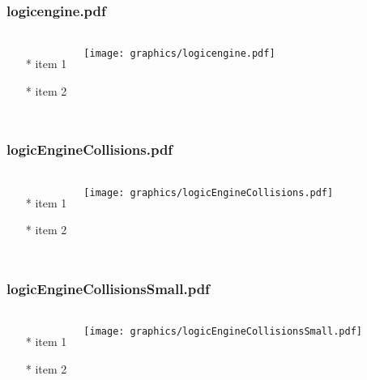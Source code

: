 \begin{frame} \frametitle{logicengine.pdf}
    \begin{columns}[c]
        \begin{itemize}
            \item[*] item 1
            \item[*] item 2
        \end{itemize}
        \begin{minipage}{\linewidth}
            \begin{center}
            \texttt{[image: graphics/logicengine.pdf]}
            \label{gfx:logicengine.pdf}
            \end{center}
        \end{minipage}
    \end{columns}
\end{frame}
\begin{frame} \frametitle{logicEngineCollisions.pdf}
    \begin{columns}[c]
        \begin{itemize}
            \item[*] item 1
            \item[*] item 2
        \end{itemize}
        \begin{minipage}{\linewidth}
            \begin{center}
            \texttt{[image: graphics/logicEngineCollisions.pdf]}
            \label{gfx:logicEngineCollisions.pdf}
            \end{center}
        \end{minipage}
    \end{columns}
\end{frame}
\begin{frame} \frametitle{logicEngineCollisionsSmall.pdf}
    \begin{columns}[c]
        \begin{itemize}
            \item[*] item 1
            \item[*] item 2
        \end{itemize}
        \begin{minipage}{\linewidth}
            \begin{center}
            \texttt{[image: graphics/logicEngineCollisionsSmall.pdf]}
            \label{gfx:logicEngineCollisionsSmall.pdf}
            \end{center}
        \end{minipage}
    \end{columns}
\end{frame}
